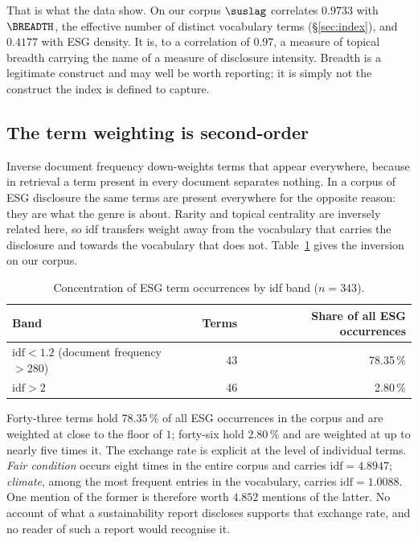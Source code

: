 That is what the data show. On our corpus $\suslag$ correlates $0.9733$ with $\BREADTH$, the
effective number of distinct vocabulary terms (\S\ref{sec:index}), and $0.4177$ with ESG
density. It is, to a correlation of $0.97$, a measure of topical breadth carrying the name of
a measure of disclosure intensity. Breadth is a legitimate construct and may well be worth
reporting; it is simply not the construct the index is defined to capture.

\subsection{The term weighting is second-order}

Inverse document frequency down-weights terms that appear everywhere, because in retrieval a
term present in every document separates nothing. In a corpus of ESG disclosure the same
terms are present everywhere for the opposite reason: they are what the genre is about.
Rarity and topical centrality are inversely related here, so idf transfers weight away from
the vocabulary that carries the disclosure and towards the vocabulary that does not.
Table~\ref{tab:measurement-idf} gives the inversion on our corpus.

\begin{table}[ht]
\centering
\caption{Concentration of ESG term occurrences by idf band ($n = 343$).}
\label{tab:measurement-idf}
\begin{tabular}{lrr}
\toprule
Band & Terms & Share of all ESG occurrences \\
\midrule
$\mathrm{idf} < 1.2$ (document frequency $> 280$) & 43 & 78.35\,\% \\
$\mathrm{idf} > 2$                                & 46 & 2.80\,\% \\
\bottomrule
\end{tabular}
\end{table}

Forty-three terms hold 78.35\,\% of all ESG occurrences in the corpus and are weighted at
close to the floor of $1$; forty-six hold 2.80\,\% and are weighted at up to nearly five
times it. The exchange rate is explicit at the level of individual terms. \emph{Fair
condition} occurs eight times in the entire corpus and carries $\mathrm{idf} = 4.8947$;
\emph{climate}, among the most frequent entries in the vocabulary, carries
$\mathrm{idf} = 1.0088$. One mention of the former is therefore worth $4.852$ mentions of the
latter. No account of what a sustainability report discloses supports that exchange rate, and
no reader of such a report would recognise it.

